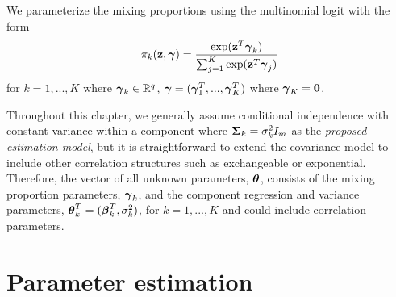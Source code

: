 We parameterize the mixing proportions using the multinomial logit with the form
$$\pi_{k}(\mathbf z,\boldsymbol\gamma)=\frac{\exp(\mathbf z^{T}\boldsymbol\gamma_{k})}{\sum_{j=1}^{K}\exp(\mathbf z^{T}\boldsymbol\gamma_{j})}$$ 
for $k=1,...,K$ where $\boldsymbol \gamma_{k}\in\mathbb{R}^{q}$, $\boldsymbol\gamma = (\boldsymbol\gamma_1^T,...,\boldsymbol\gamma_K^T)$ where $\boldsymbol\gamma_{K}=\mathbf 0$.

Throughout this chapter, we generally assume conditional independence with constant variance within a component where $\mathbf\Sigma_{k}=\sigma^{2}_{k}I_{m}$ as the {\em proposed estimation model}, but it is straightforward to extend the covariance model to include other correlation structures such as exchangeable or exponential. Therefore, the vector of all unknown parameters, $\boldsymbol\theta$, consists of the mixing proportion parameters, $\boldsymbol\gamma_{k}$, and the component regression and variance parameters, $\boldsymbol\theta^{T}_{k}=(\boldsymbol\beta^{T}_{k},\sigma^{2}_{k})$, for $k=1,...,K$ and could include correlation parameters.  

\section{Parameter estimation}

